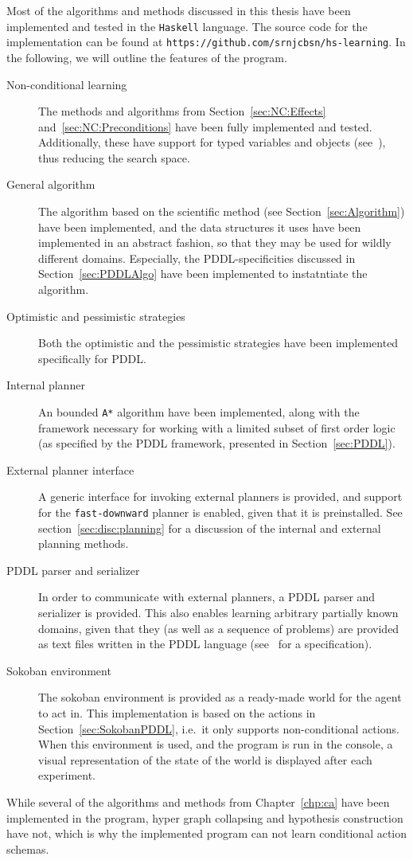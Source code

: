 \documentclass[../Master.tex]{subfiles}
\begin{document}
Most of the algorithms and methods discussed in this thesis have been implemented and tested in the \texttt{Haskell} language. The source code for the implementation can be found at \texttt{https://github.com/srnjcbsn/hs-learning}. In the following, we will outline the features of the program.

\begin{description}
    \item[Non-conditional learning] 
        The methods and algorithms from Section~\ref{sec:NC:Effects} and~\ref{sec:NC:Preconditions} have been fully implemented and tested. Additionally, these have support for typed variables and objects (see~\cite{PDDL}), thus reducing the search space.
    \item[General algorithm]
        The algorithm based on the scientific method (see Section~\ref{sec:Algorithm}) have been implemented, and the data structures it uses have been implemented in an abstract fashion, so that they may be used for wildly different domains. Especially, the PDDL-specificities discussed in Section~\ref{sec:PDDLAlgo} have been implemented to instatntiate the algorithm.
    \item[Optimistic and pessimistic strategies]
        Both the optimistic and the pessimistic strategies have been implemented specifically for PDDL.
    \item[Internal planner] An bounded \texttt{A*} algorithm have been implemented, along with the framework necessary for working with a limited subset of first order logic (as specified by the PDDL framework, presented in Section~\ref{sec:PDDL}).
    \item[External planner interface] A generic interface for invoking external planners is provided, and support for the \texttt{fast-downward} planner is enabled, given that it is preinstalled. See section~\ref{sec:disc:planning} for a discussion of the internal and external planning methods.
    \item[PDDL parser and serializer]
        In order to communicate with external planners, a PDDL parser and serializer is provided. This also enables learning arbitrary partially known domains, given that they (as well as a sequence of problems) are provided as text files written in the PDDL language (see~\cite{PDDL} for a specification).
    \item[Sokoban environment]
        The sokoban environment is provided as a ready-made world for the agent to act in. This implementation is based on the actions in Section~\ref{sec:SokobanPDDL}, i.e.\ it only supports non-conditional actions. When this environment is used, and the program is run in the console, a visual representation of the state of the world is displayed after each experiment.
\end{description}

While several of the algorithms and methods from Chapter~\ref{chp:ca} have been implemented in the program, hyper graph collapsing and hypothesis construction have not, which is why the implemented program can not learn conditional action schemas.
\end{document}
